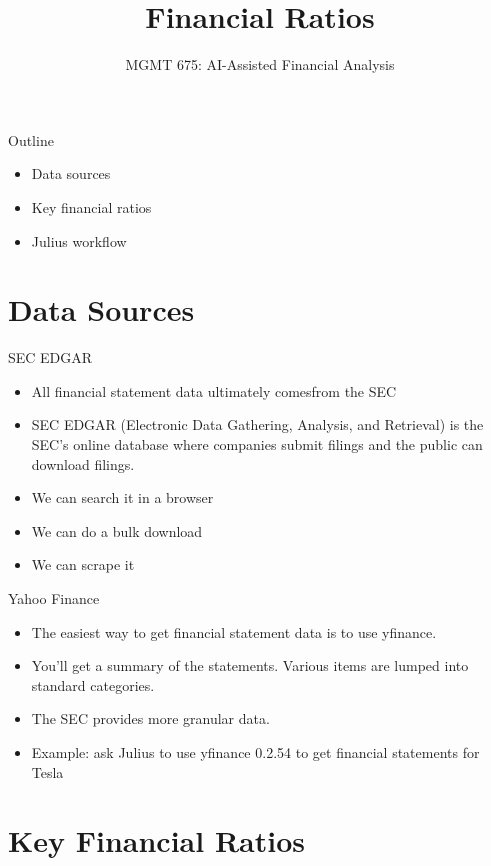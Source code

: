 \documentclass[10pt]{beamer}
\title{Financial Ratios}
\subtitle{MGMT 675: AI-Assisted Financial Analysis}
\date{}
\begin{document}
\begin{frame}[plain]
\titlepage
\end{frame}

\begin{frame}{Outline}
\begin{itemize}
\item Data sources
\item Key financial ratios
\item Julius workflow
\end{itemize}
\end{frame}

\section{Data Sources}

\begin{frame}{SEC EDGAR}
\begin{itemize}
\item All financial statement data ultimately comesfrom the SEC 
\item SEC EDGAR (Electronic Data Gathering, Analysis, and Retrieval) is the SEC's online database where companies submit  filings and the public can download filings. 
\item We can search it in a browser
\item We can do a bulk download
\item We can scrape it
\end{itemize}
\end{frame}

\begin{frame}{Yahoo Finance}
\begin{itemize}
\item The easiest way to get financial statement data is to use yfinance.
\item You'll get a summary of the statements.  Various items are lumped into standard categories.
\item The SEC provides more granular data.
\item Example: ask Julius to use yfinance 0.2.54 to get financial statements for Tesla
\end{itemize}
\end{frame}

\section{Key Financial Ratios}
\end{document}
